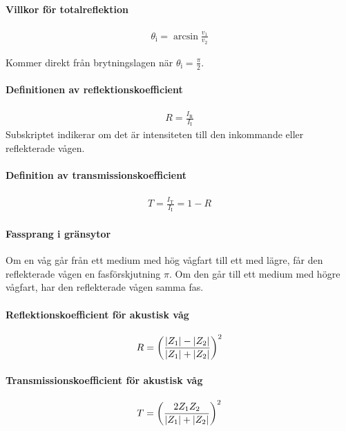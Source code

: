 \paragraph{Villkor för totalreflektion}
\begin{align*}
	\theta_{\text{i}} = \arcsin{\frac{v_1}{v_2}}
\end{align*}

\deriv
Kommer direkt från brytningslagen när $\theta_{\text{i}} = \frac{\pi}{2}$.

\paragraph{Definitionen av reflektionskoefficient}
\begin{align*}
	R = \frac{I_\text{R}}{I_\text{I}}
\end{align*}
Subskriptet indikerar om det är intensiteten till den inkommande eller reflekterade vågen.

\paragraph{Definition av transmissionskoefficient}
\begin{align*}
	T = \frac{I_\text{T}}{I_\text{I}} = 1 - R
\end{align*}

\paragraph{Fassprang i gränsytor}
Om en våg går från ett medium med hög vågfart till ett med lägre, får den reflekterade vågen en fasförskjutning $\pi$. Om den går till ett medium med högre vågfart, har den reflekterade vågen samma fas.

\paragraph{Reflektionskoefficient för akustisk våg}
\begin{align*}
	R = \left(\frac{\abs{Z_1} - \abs{Z_2}}{\abs{Z_1} + \abs{Z_2}}\right)^2
\end{align*}

\paragraph{Transmissionskoefficient för akustisk våg}
\begin{align*}
	T = \left(\frac{2Z_1Z_2}{\abs{Z_1} + \abs{Z_2}}\right)^2
\end{align*}

